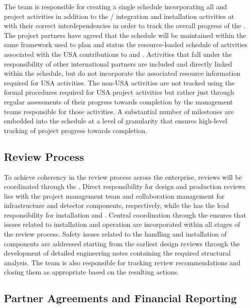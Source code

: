 The  team is responsible for creating a single
 schedule incorporating all  and
 project activities in addition to the
/ integration and installation activities at
 with their correct interdependencies in order to track
the overall progress of the .  The project partners have
agreed that the  schedule will be maintained within the same
 framework used to plan and status the resource-loaded
schedule of activities associated with the USA contributions to
 and .  Activities that fall under the
responsibility of other international partners are included and
directly linked within the  schedule, but do not incorporate
the associated resource information required for USA activities.  The
non-USA activities are not tracked using the formal 
procedures required for USA project activities but rather just through
regular assessments of their progress towards completion by the
management teams responsible for those activities.  A substantial
number of milestones are embedded into the schedule at a level of
granularity that ensures high-level tracking of project progress
towards completion.

\subsection{Review Process}
\label{sec:dune_review}

To achieve coherency in the review process across the 
enterprise, reviews will be coordinated through the .
Direct responsibility for design and production reviews lies with the
 project management team and  collaboration
management for infrastructure and detector components, respectively,
while the  has the lead responsibility for installation and
.  Central coordination through the
 ensures that issues related to installation and operation
are incorporated within all stages of the review process.  Safety
issues related to the handling and installation of components are
addressed starting from the earliest design reviews through the
development of detailed engineering notes containing the required
structural analysis.  The  team is also responsible for
tracking review recommendations and closing them as appropriate based
on the resulting actions.

\subsection{Partner Agreements and Financial Reporting}
\label{sec:dune_agreements}

